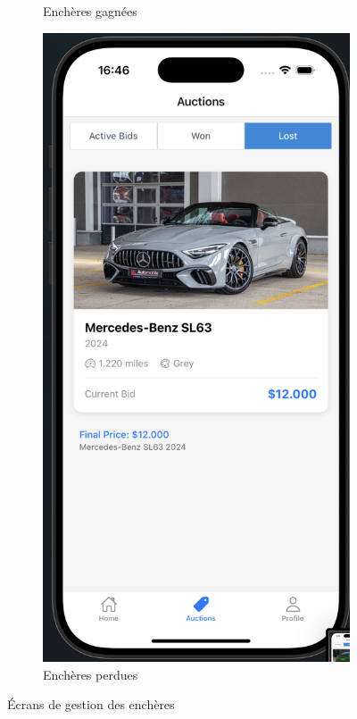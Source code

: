 \begin{figure}[H]
\begin{subfigure}[b]{0.32\textwidth}
        \caption{Enchères gagnées}
        \label{fig:won-auctions}
    \end{subfigure}
    \hfill
    \begin{subfigure}[b]{0.32\textwidth}
        \includegraphics[width=\textwidth]{images/auction page with lost bids.png}
        \caption{Enchères perdues}
        \label{fig:lost-auctions}
    \end{subfigure}
    \caption{Écrans de gestion des enchères}
    \label{fig:auction-management}
\end{figure}

